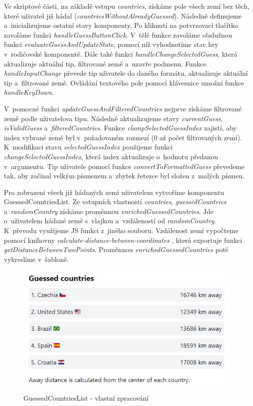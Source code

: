 Ve skriptové části, na základě vstupu \emph{countries}, získáme pole všech zemí bez těch, které uživatel již hádal (\emph{countriesWithoutAlreadyGuessed}). 
Následně definujeme a~inicializujeme ostatní stavy komponenty. Po kliknutí na potvrzovací tlačítko zavoláme funkci \emph{handleGuessButtonClick}. 
V~tělě funkce zavoláme obslužnou funkci \emph{evaluateGuessAndUpdateState}, pomocí níž vyhodnotíme stav hry v~rodičovské komponentě. 
Dále také funkci \emph{handleChangeSelectedGuess}, která aktualizuje aktuální tip, filtrované země a~uzavře podmenu. 
Funkce \emph{handleInputChange} převede tip uživatele do daného formátu, aktualizuje aktuální tip a~filtrované země. Ovládání textového pole pomocí klávesnice umožní funkce \emph{handleKeyDown}.

V~pomocné funkci \emph{updateGuessAndFilteredCountries} nejprve získáme filtrované země podle uživatelova tipu. Následně aktualizujeme stavy \emph{currentGuess}, \emph{isValidGuess} a~\emph{filteredCountries}. 
Funkce \emph{clampSelectedGuessIndex} zajistí, aby index vybrané země byl v~požadovaném rozmezí (0 až počet filtrovaných zemí). 
K~modifikaci stavu \emph{selectedGuessIndex} použijeme funkci \emph{changeSelectedGuessIndex}, která index aktualizuje o~hodnotu předanou v~argumentu. 
Tip uživatele pomocí funkce \emph{convertToFormattedGuess} převedeme tak, aby začínal velkým písmenem a~zbytek řetezce byl složen z~malých písmen.

Pro zobrazení všech již hádaných zemí uživatelem vytvoříme komponentu GuessedCountriesList. 
Ze vstupních vlastností \emph{countries}, \emph{guessedCountries} a~\emph{randomCountry} získáme proměnnou \emph{enrichedGuessedCountries}. 
Jde o~uživatelem hádané země s~vlajkou a~vzdáleností od \emph{randomCountry}. K~převodu využijeme JS funkci z~jiného souboru. 
Vzdálenost zemí vypočteme pomocí knihovny \emph{calculate-distance-between-coordinates} \cite{distancebetweencoordinates}, která exportuje funkci \emph{getDistanceBetweenTwoPoints}. 
Proměnnou \emph{enrichedGuessedCountries} poté vykreslíme v~šabloně.

\begin{figure}[htb]
	\centering
		\includegraphics[width=.7\textwidth]{images/GuessedCountriesList.jpg}
	\caption[GuessedCountriesList]{GuessedCountriesList - vlastní zpracování}
	\label{fig:svelteguessedcountrieslist}
\end{figure}

